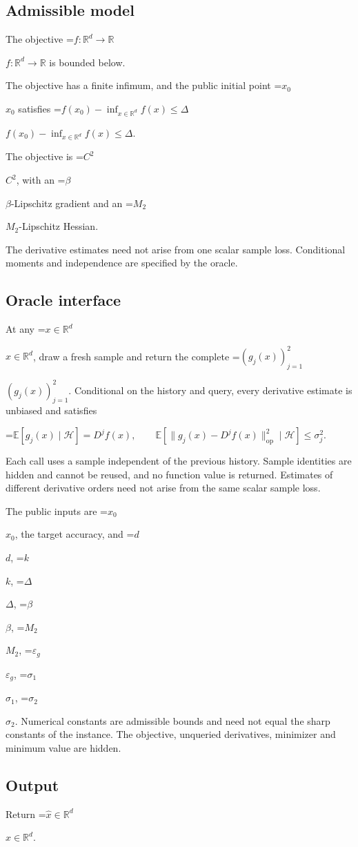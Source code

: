 \documentclass[10pt,a4paper]{article}
\newcommand{\AtlasMath}[1]{\par\begingroup\centering\setbox0=\hbox{$\displaystyle #1$}\ifdim\wd0>1.4\linewidth\typeout{ATLAS WIDE FORMULA: \the\wd0}\fi\ifdim\wd0>\linewidth\resizebox{\linewidth}{!}{\box0}\else\box0\fi\par\endgroup}
\newcommand{\AtlasInlineMath}[1]{\begingroup\setbox0=\hbox{$#1$}\ifdim\wd0>.4\linewidth\endgroup\AtlasMath{#1}\else\endgroup$#1$\fi}
\begin{document}
\subsection{Admissible model}
The objective \AtlasInlineMath{f:\mathbb{R}^d\to\mathbb{R}} is bounded below.

The objective has a finite infimum, and the public initial point \AtlasInlineMath{x_0} satisfies \AtlasInlineMath{f(x_0)-\inf_{x\in \mathbb{R}^d}f(x)\le\Delta}.

The objective is \AtlasInlineMath{C^2}, with an \AtlasInlineMath{\beta}-Lipschitz gradient and an \AtlasInlineMath{M_2}-Lipschitz Hessian.

The derivative estimates need not arise from one scalar sample loss. Conditional moments and independence are specified by the oracle.

\subsection{Oracle interface}
At any \AtlasInlineMath{x\in\mathbb{R}^d}, draw a fresh sample and return the complete \AtlasInlineMath{(g_j(x))_{j=1}^{2}}. Conditional on the history and query, every derivative estimate is unbiased and satisfies


\AtlasMath{\mathbb{E}[g_j(x)\mid\mathcal{H}]=D^jf(x),\qquad\mathbb{E}[\|g_j(x)-D^jf(x)\|_{\mathrm{op}}^2\mid\mathcal{H}]\le\sigma_j^2.}


Each call uses a sample independent of the previous history. Sample identities are hidden and cannot be reused, and no function value is returned. Estimates of different derivative orders need not arise from the same scalar sample loss.

The public inputs are \AtlasInlineMath{x_0}, the target accuracy, and \AtlasInlineMath{d}, \AtlasInlineMath{k}, \AtlasInlineMath{\Delta}, \AtlasInlineMath{\beta}, \AtlasInlineMath{M_2}, \AtlasInlineMath{\varepsilon_g}, \AtlasInlineMath{\sigma_1}, \AtlasInlineMath{\sigma_2}. Numerical constants are admissible bounds and need not equal the sharp constants of the instance. The objective, unqueried derivatives, minimizer and minimum value are hidden.

\subsection{Output}
Return \AtlasInlineMath{\widehat{x}\in \mathbb{R}^d}.
\end{document}
